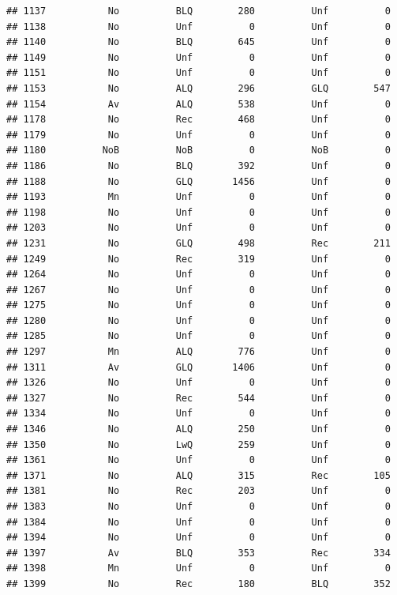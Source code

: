 \documentclass[]{article}
\begin{document}
\begin{verbatim}
## 1137           No          BLQ        280          Unf          0
## 1138           No          Unf          0          Unf          0
## 1140           No          BLQ        645          Unf          0
## 1149           No          Unf          0          Unf          0
## 1151           No          Unf          0          Unf          0
## 1153           No          ALQ        296          GLQ        547
## 1154           Av          ALQ        538          Unf          0
## 1178           No          Rec        468          Unf          0
## 1179           No          Unf          0          Unf          0
## 1180          NoB          NoB          0          NoB          0
## 1186           No          BLQ        392          Unf          0
## 1188           No          GLQ       1456          Unf          0
## 1193           Mn          Unf          0          Unf          0
## 1198           No          Unf          0          Unf          0
## 1203           No          Unf          0          Unf          0
## 1231           No          GLQ        498          Rec        211
## 1249           No          Rec        319          Unf          0
## 1264           No          Unf          0          Unf          0
## 1267           No          Unf          0          Unf          0
## 1275           No          Unf          0          Unf          0
## 1280           No          Unf          0          Unf          0
## 1285           No          Unf          0          Unf          0
## 1297           Mn          ALQ        776          Unf          0
## 1311           Av          GLQ       1406          Unf          0
## 1326           No          Unf          0          Unf          0
## 1327           No          Rec        544          Unf          0
## 1334           No          Unf          0          Unf          0
## 1346           No          ALQ        250          Unf          0
## 1350           No          LwQ        259          Unf          0
## 1361           No          Unf          0          Unf          0
## 1371           No          ALQ        315          Rec        105
## 1381           No          Rec        203          Unf          0
## 1383           No          Unf          0          Unf          0
## 1384           No          Unf          0          Unf          0
## 1394           No          Unf          0          Unf          0
## 1397           Av          BLQ        353          Rec        334
## 1398           Mn          Unf          0          Unf          0
## 1399           No          Rec        180          BLQ        352

\end{verbatim}
\end{document}
